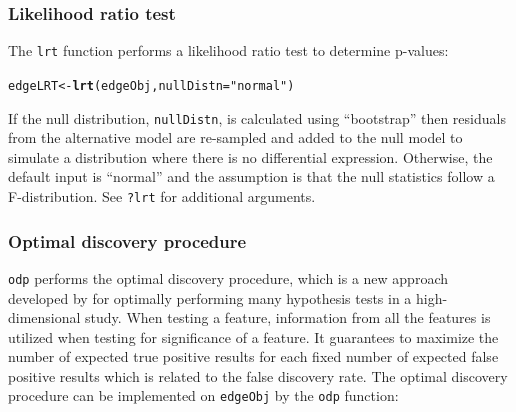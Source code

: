 \documentclass{article}\usepackage[]{graphicx}\usepackage[]{color}
\makeatletter
\newcommand{\hlstr}[1]{\textcolor[rgb]{0.192,0.494,0.8}{#1}}%
\newcommand{\hlstd}[1]{\textcolor[rgb]{0.345,0.345,0.345}{#1}}%
\newcommand{\hlkwb}[1]{\textcolor[rgb]{0.69,0.353,0.396}{#1}}%
\newcommand{\hlkwc}[1]{\textcolor[rgb]{0.333,0.667,0.333}{#1}}%
\newcommand{\hlkwd}[1]{\textcolor[rgb]{0.737,0.353,0.396}{\textbf{#1}}}%
\newenvironment{kframe}{%
 \def\at@end@of@kframe{}%
 \ifinner\ifhmode%
  \def\at@end@of@kframe{\end{minipage}}%
  \begin{minipage}{\columnwidth}%
 \fi\fi%
 \def\FrameCommand##1{\hskip\@totalleftmargin \hskip-\fboxsep
 \colorbox{shadecolor}{##1}\hskip-\fboxsep
     \hskip-\linewidth \hskip-\@totalleftmargin \hskip\columnwidth}%
 \MakeFramed {\advance\hsize-\width
   \@totalleftmargin\z@ \linewidth\hsize
   \@setminipage}}%
 {\par\unskip\endMakeFramed%
 \at@end@of@kframe}
\newenvironment{knitrout}{}{} %
\makeatother
\begin{document}
\subsubsection{Likelihood ratio test}
The {\tt lrt} function performs a likelihood ratio test to determine p-values:

\begin{knitrout}
\color{fgcolor}\begin{kframe}
\begin{alltt}
\hlstd{edgeLRT} \hlkwb{<-} \hlkwd{lrt}\hlstd{(edgeObj,} \hlkwc{nullDistn} \hlstd{=} \hlstr{"normal"}\hlstd{)}
\end{alltt}
\end{kframe}
\end{knitrout}
If the null distribution, {\tt nullDistn}, is calculated using ``bootstrap'' then residuals from the alternative model are re-sampled and added to the null model to simulate a distribution where there is no differential expression. Otherwise, the default input is ``normal'' and the assumption is that the null statistics follow a F-distribution. See {\tt ?lrt} for additional arguments.



\subsubsection{Optimal discovery procedure}
{\tt odp} performs the optimal discovery procedure, which is a new approach developed by \cite{storey:2005} for optimally performing many hypothesis tests in a high-dimensional study. When testing a feature, information from all the features is utilized when testing for significance of a feature. It guarantees to maximize the number of expected true positive results for each fixed number of expected false positive results which is related to the false discovery rate. The optimal discovery procedure can be implemented on {\tt edgeObj} by the {\tt odp} function:
\end{document}

